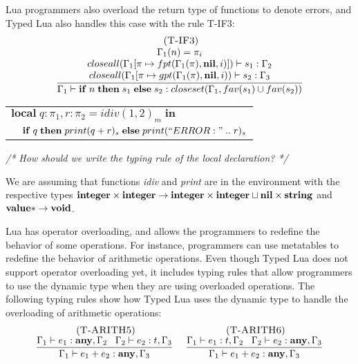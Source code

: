 Lua programmers also overload the return type of functions to denote
errors, and Typed Lua also handles this case with the rule \textsc{T-IF3}:
\[
\begin{array}{c}
\; (\textsc{T-IF3})\\
\dfrac{\begin{array}{c}
       \Gamma_{1}(n) = \pi_{i}\\
       closeall(\Gamma_{1}[\pi \mapsto fpt(\Gamma_{1}(\pi), \mathbf{nil}, i)]) \vdash s_{1}:\Gamma_{2} \\
       closeall(\Gamma_{1}[\pi \mapsto gpt(\Gamma_{1}(\pi), \mathbf{nil}, i)) \vdash s_{2}:\Gamma_{3}
      \end{array}}
      {\Gamma_{1} \vdash \mathbf{if} \; n \; \mathbf{then} \; s_{1} \; \mathbf{else} \; s_{2}:closeset(\Gamma_{1}, fav(s_{1}) \cup fav(s_{2}))}

\end{array}
\]

\begin{center}
\begin{tabular}{ll}
\multicolumn{2}{l}{$\mathbf{local} \; q:\pi_{1}, r:\pi_{2} = idiv(1, 2)_{m} \; \mathbf{in}$}\\
& \multicolumn{1}{l}{$\mathbf{if} \; q \; \mathbf{then} \; print(q + r)_{s} \; \mathbf{else} \; print(``ERROR: " \; .. \; r)_{s}$}
\end{tabular}
\end{center}

\textit{/* How should we write the typing rule of the local declaration? */}

We are assuming that functions \emph{idiv} and \emph{print} are in
the environment with the respective types
$\mathbf{integer} \times \mathbf{integer} \rightarrow \mathbf{integer} \times \mathbf{integer} \sqcup \mathbf{nil} \times \mathbf{string}$
and
$\mathbf{value}{*} \rightarrow \mathbf{void}$.

Lua has operator overloading, and allows the programmers to redefine
the behavior of some operations.
For instance, programmers can use metatables to redefine the
behavior of arithmetic operations.
Even though Typed Lua does not support operator overloading yet,
it includes typing rules that allow programmers to use the
dynamic type when they are using overloaded operations.
The following typing rules show how Typed Lua uses the dynamic type
to handle the overloading of arithmetic operations:
\[
\begin{array}{c}
\begin{array}{c}
\; (\textsc{T-ARITH5})\\
\dfrac{\Gamma_{1} \vdash e_{1}:\mathbf{any}, \Gamma_{2} \;\;\;
       \Gamma_{2} \vdash e_{2}:t, \Gamma_{3}}
      {\Gamma_{1} \vdash e_{1} + e_{2}:\mathbf{any}, \Gamma_{3}}
\end{array}
\;
\begin{array}{c}
\; (\textsc{T-ARITH6})\\
\dfrac{\Gamma_{1} \vdash e_{1}:t, \Gamma_{2} \;\;\;
       \Gamma_{2} \vdash e_{2}:\mathbf{any}, \Gamma_{3}}
      {\Gamma_{1} \vdash e_{1} + e_{2}:\mathbf{any}, \Gamma_{3}}
\end{array}
\end{array}
\]

